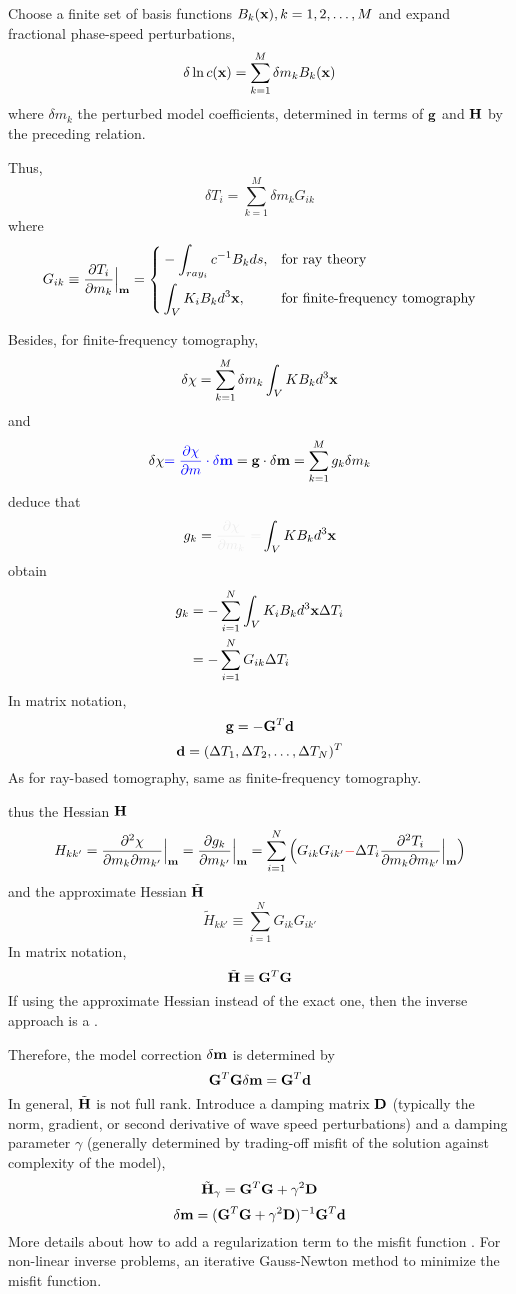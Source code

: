 Choose a finite set of basis functions $B_k(\mathbf{x}),k=1,2,\ldots,M$
and expand fractional phase-speed perturbations,
\[ \delta\ln c(\mathbf{x})=\sum_{k=1}^M\delta m_kB_k(\mathbf{x}) \]
where $\delta m_k$ the perturbed model coefficients,
determined in terms of $\mathbf{g}$ and $\mathbf{H}$ by the preceding relation.

Thus,
\[ \delta T_i=\sum_{k=1}^M\delta m_kG_{ik} \]
where
\begin{equation*}
  G_{ik}\equiv\frac{\partial T_i}{\partial m_k}\Big|_{\mathbf{m}}=\left\{
  \begin{aligned}
    & -\int_{ray_i}c^{-1}B_kds, & & \text{for ray theory} \\
    & \int_VK_iB_kd^3\mathbf{x}, & & \text{for finite-frequency tomography} \\
  \end{aligned} \right.
\end{equation*}

Besides, for finite-frequency tomography,
\[ \delta\chi=\sum_{k=1}^M\delta m_k\int_VKB_kd^3\mathbf{x} \]
and
\[ \delta\chi{\color{blue}=\frac{\partial\chi}{\partial m}\cdot\delta\mathbf{m}}=\mathbf{g}\cdot\delta\mathbf{m}=\sum_{k=1}^Mg_k\delta m_k \]
deduce that
\[ g_k=\myde{\frac{\partial\chi}{\partial m_k}=}\int_VKB_kd^3\mbf x \]
obtain
\begin{align*}
  g_k & =-\sum_{i=1}^N\int_VK_iB_kd^3\mathbf{x}\Delta T_i \\
  & =-\sum_{i=1}^NG_{ik}\Delta T_i \\
\end{align*}
In matrix notation,
\[ \mathbf{g}=-\mathbf{G}^T\mathbf{d} \]
\[ \mathbf{d}=(\Delta T_1,\Delta T_2,\ldots,\Delta T_N)^T \]
As for ray-based tomography, same as finite-frequency tomography.

thus the Hessian $\mathbf{H}$
\[ H_{kk'}=\frac{\partial^2\chi}{\partial m_k\partial m_{k'}}\Big|_{\mathbf{m}}=\frac{\partial g_k}{\partial m_{k'}}\Big|_{\mathbf{m}}=\sum_{i=1}^N\Big(G_{ik}G_{ik'}{\color{red}-}\Delta T_i\frac{\partial^2T_i}{\partial m_k\partial m_{k'}}\Big|_{\mathbf{m}}\Big) \]
and the approximate Hessian $\tilde{\mathbf{H}}$
\[ \tilde H_{kk'}\equiv\sum_{i=1}^NG_{ik}G_{ik'} \]
In matrix notation,
\[ \tilde{\mathbf{H}}\equiv\mathbf{G}^T\mathbf{G} \]
If using the approximate Hessian instead of the exact one,
then the inverse approach is a .

Therefore, the model correction $\delta\mathbf{m}$ is determined by
\[ \mathbf{G}^T\mathbf{G}\delta\mathbf{m}=\mathbf{G}^T\mathbf{d} \]
In general, $\tilde{\mathbf{H}}$ is not full rank.
Introduce a damping matrix $\mathbf{D}$
(typically the norm, gradient, or second derivative of wave speed perturbations)
and a damping parameter $\gamma$
(generally determined by trading-off misfit of the solution against complexity of the model),
\[ \tilde{\mathbf{H}}_\gamma=\mathbf{G}^T\mathbf{G}+\gamma^2\mathbf{D} \]
\[ \delta\mathbf{m}=(\mathbf{G}^T\mathbf{G}+\gamma^2\mathbf{D})^{-1}\mathbf{G}^T\mathbf{d} \]
More details about how to add a regularization term to the misfit function
.
For non-linear inverse problems, an iterative Gauss-Newton method to minimize the misfit function.


